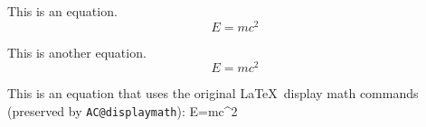 \documentclass{article}
\begin{document}

This is an equation.
\[
E=mc^2
\]

This is another equation.
\begin{equation}
E=mc^2
\end{equation}

This is an equation that  uses the original \LaTeX\ display math commands (preserved by \texttt{AC@displaymath}):
\makeatletter
\AC@displaymath
E=mc^2
\AC@enddisplaymath
\makeatother
\end{document}
